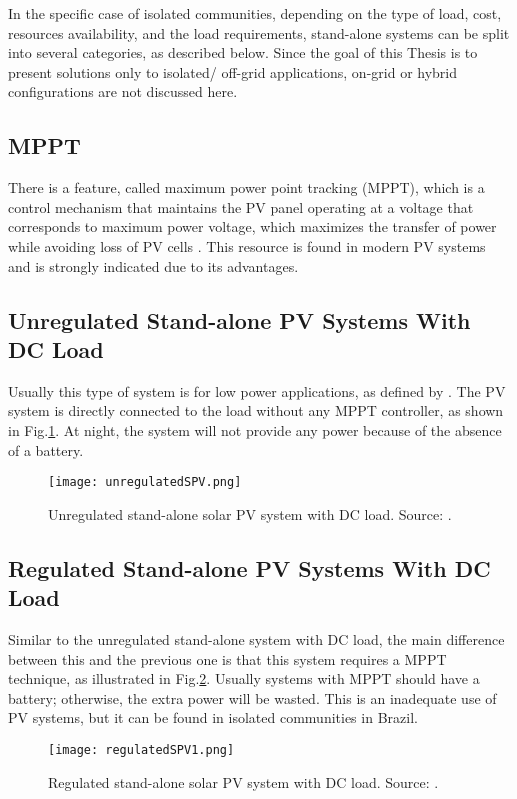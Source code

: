 In the specific case of isolated communities, depending on the type of load, cost, resources availability, and the load requirements, stand-alone systems can be split into several categories, as described below. Since the goal of this Thesis is to present solutions only to isolated/ off-grid applications, on-grid or hybrid configurations are not discussed here.

\subsection{MPPT} 

There is a feature, called maximum power point tracking (MPPT), which is a control mechanism that maintains the PV panel operating at a voltage that corresponds to maximum power voltage, which maximizes the transfer of power while avoiding loss of PV cells \cite{Pinho}. This resource is found in modern PV systems and is strongly indicated due to its advantages.

\subsection{Unregulated Stand-alone PV Systems With DC Load }

Usually this type of system is for low power applications, as defined by \cite{Roy}. The PV system is directly connected to the load without any MPPT controller, as shown in Fig.\ref{fig:unregSPV}. At night, the system will not provide any power because of the absence of a battery. 
 
\begin{figure}[h]
\texttt{[image: unregulatedSPV.png]}
\centering
\caption{Unregulated stand-alone solar PV system with DC load. Source: \cite{Roy}.}
\label{fig:unregSPV}
\end{figure}

\subsection{Regulated Stand-alone PV Systems With DC Load}
Similar to the unregulated stand-alone system with DC load, the main difference between this and the previous one is that this system requires a MPPT technique, as illustrated in Fig.\ref{fig:regSPV1}. Usually systems with MPPT should have a battery; otherwise, the extra power will be wasted. This is an inadequate use of PV systems, but it can be found in isolated communities in Brazil.

\begin{figure}[h]
\texttt{[image: regulatedSPV1.png]}
\centering
\caption{Regulated stand-alone solar PV system with DC load. Source: \cite{Roy}.}
\label{fig:regSPV1}
\end{figure}

